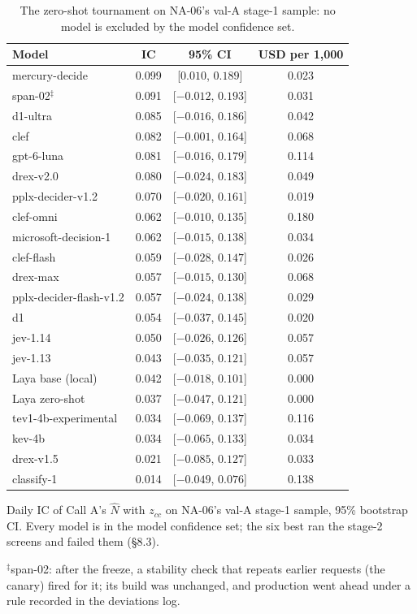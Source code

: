 \begin{table}[htbp]
\centering
\small
\begin{threeparttable}
\caption{The zero-shot tournament on NA-06's val-A stage-1 sample: no model is excluded by the model confidence set.}\label{tab:a-tournament}
\begin{tabular}{@{}lS[table-format=1.3]cS[table-format=1.3]@{}}
\toprule
Model & {IC} & 95\% CI & {USD per 1,000} \\
\midrule
mercury-decide & 0.099 & [$0.010$, $0.189$] & 0.023 \\
span-02$^{\ddagger}$ & 0.091 & [$-0.012$, $0.193$] & 0.031 \\
d1-ultra & 0.085 & [$-0.016$, $0.186$] & 0.042 \\
clef & 0.082 & [$-0.001$, $0.164$] & 0.068 \\
gpt-6-luna & 0.081 & [$-0.016$, $0.179$] & 0.114 \\
drex-v2.0 & 0.080 & [$-0.024$, $0.183$] & 0.049 \\
pplx-decider-v1.2 & 0.070 & [$-0.020$, $0.161$] & 0.019 \\
clef-omni & 0.062 & [$-0.010$, $0.135$] & 0.180 \\
microsoft-decision-1 & 0.062 & [$-0.015$, $0.138$] & 0.034 \\
clef-flash & 0.059 & [$-0.028$, $0.147$] & 0.026 \\
drex-max & 0.057 & [$-0.015$, $0.130$] & 0.068 \\
pplx-decider-flash-v1.2 & 0.057 & [$-0.024$, $0.138$] & 0.029 \\
d1 & 0.054 & [$-0.037$, $0.145$] & 0.020 \\
jev-1.14 & 0.050 & [$-0.026$, $0.126$] & 0.057 \\
jev-1.13 & 0.043 & [$-0.035$, $0.121$] & 0.057 \\
Laya base (local) & 0.042 & [$-0.018$, $0.101$] & 0.000 \\
Laya zero-shot & 0.037 & [$-0.047$, $0.121$] & 0.000 \\
tev1-4b-experimental & 0.034 & [$-0.069$, $0.137$] & 0.116 \\
kev-4b & 0.034 & [$-0.065$, $0.133$] & 0.034 \\
drex-v1.5 & 0.021 & [$-0.085$, $0.127$] & 0.033 \\
classify-1 & 0.014 & [$-0.049$, $0.076$] & 0.138 \\
\bottomrule
\end{tabular}
\begin{tablenotes}[flushleft]\footnotesize
\item Daily IC of Call A's $\hat N$ with $z_{cc}$ on NA-06's val-A stage-1 sample, 95\% bootstrap CI. Every model is in the model confidence set; the six best ran the stage-2 screens and failed them (\S8.3).
\item $^{\ddagger}$span-02: after the freeze, a stability check that repeats earlier requests (the canary) fired for it; its build was unchanged, and production went ahead under a rule recorded in the deviations log.
\end{tablenotes}
\end{threeparttable}
\end{table}
